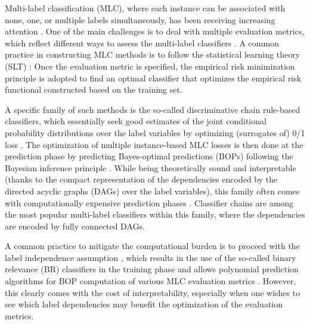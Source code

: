 \documentclass[a4paper,fleqn]{cas-sc}
\begin{document}
Multi-label classification (MLC), where each instance can be associated with none, one, or multiple labels simultaneously, has been receiving increasing attention \citep{garcia2024thorough,madjarov2012extensive,nguyen2026probabilistic,nguyen2026robust,tsoumakas2010random,zhang2013review}. One of the main challenges is to deal with multiple evaluation metrics, which reflect different ways to assess the multi-label classifiers \citep{garcia2024thorough,nguyen2021multilabel,zhang2013review}. A common practice in constructing MLC methods is to follow the statistical learning theory (SLT) \citep{vapnik1999overview}: Once the evaluation metric is specified, the empirical risk minimization principle is adopted to find an optimal classifier that optimizes the empirical risk functional constructed based on the training set.

A specific family of such methods is the so-called discriminative chain rule-based classifiers, which essentially seek good estimates of the joint conditional probability distributions over the label variables by optimizing (surrogates of) 0/1 loss \citep{gerych2021recurrent,gonccalves2015simpler,liu2015optimality,nguyen2023probabilistic,nguyen2026probabilistic}. The optimization of multiple instance-based MLC losses is then done at the prediction phase by predicting Bayes-optimal predictions (BOPs) following the Bayesian inference principle \citep{dembczynski2012label,nguyen2026probabilistic,waegeman2014bayes}. While being theoretically sound and interpretable (thanks to the compact representation of the dependencies encoded by the directed acyclic graphs (DAGs) over the label variables), this family often comes with computationally expensive prediction phases \citep{nguyen2023probabilistic,nguyen2026probabilistic}. Classifier chains \citep{read2011classifier,read2021classifier} are among the most popular multi-label classifiers within this family, where the dependencies are encoded by fully connected DAGs. 

A common practice to mitigate the computational burden is to proceed with the label independence assumption \citep{dembczynski2012label,nguyen2021multilabel}, which results in the use of the so-called binary relevance (BR) classifiers in the training phase and allows polynomial prediction algorithms for BOP computation of various MLC evaluation metrics \citep{nguyen2021multilabel}. However, this clearly comes with the cost of interpretability, especially when one wishes to see which label dependencies may benefit the optimization of the evaluation metrics.   
\end{document}
